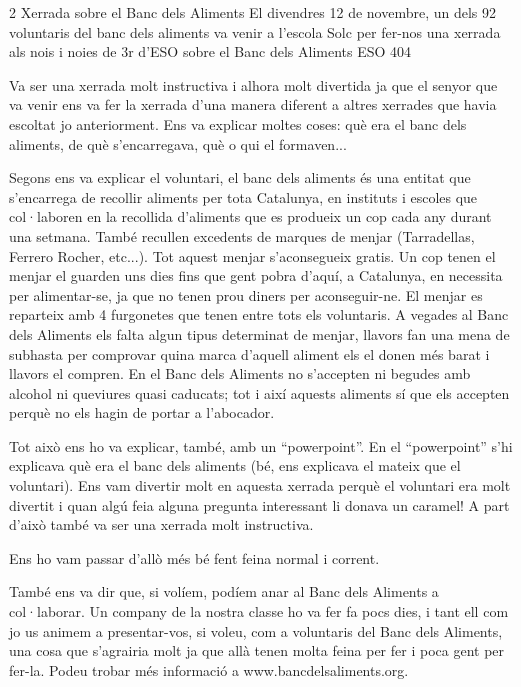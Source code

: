 
\begin{news}
{2} %
{Xerrada sobre el Banc dels Aliments}
{El divendres 12 de novembre,  un dels 92 voluntaris del banc dels aliments va venir a l’escola Solc per fer-nos una xerrada als nois i noies de 3r d’ESO sobre el Banc dels Aliments}
{ESO}
{404} %


Va ser una xerrada molt instructiva i alhora molt divertida ja que el senyor que va venir ens va fer la xerrada d’una manera diferent a altres xerrades que havia escoltat jo anteriorment. Ens va explicar moltes coses: què era el banc dels aliments, de què s’encarregava, què o qui el formaven...

Segons ens va explicar el voluntari, el banc dels aliments és una entitat que s’encarrega de recollir aliments per tota Catalunya, en instituts i escoles que col·laboren en la recollida d’aliments que es produeix un cop cada any durant una setmana. També recullen excedents de marques de menjar (Tarradellas, Ferrero Rocher, etc...). Tot aquest menjar s’aconsegueix gratis. Un cop tenen el menjar el guarden uns dies fins que gent pobra d’aquí, a Catalunya, en necessita per alimentar-se,  ja que no tenen prou diners per aconseguir-ne. El menjar es reparteix amb 4 furgonetes que tenen entre tots els voluntaris. A vegades al Banc dels Aliments els falta algun tipus determinat de menjar, llavors fan una mena de subhasta per comprovar quina marca d’aquell aliment els el donen més barat i llavors el compren. En el Banc dels Aliments no s’accepten ni begudes amb alcohol ni queviures quasi caducats;  tot i així aquests aliments sí que els accepten perquè no els hagin de portar a l’abocador.

Tot això ens  ho va explicar, també,  amb un “powerpoint”. En el “powerpoint” s’hi explicava què era el banc dels aliments (bé, ens explicava el mateix que el voluntari). Ens vam divertir molt en aquesta xerrada perquè el voluntari era molt divertit i quan algú feia alguna pregunta interessant li donava un caramel! A part d’això també va ser una xerrada molt instructiva.

Ens ho vam passar d’allò més bé fent feina normal i corrent.

També ens va dir que, si volíem, podíem anar al Banc dels Aliments a col·laborar. Un company de la nostra classe ho va fer fa pocs dies, i tant ell com jo us animem a presentar-vos, si voleu, com a voluntaris del Banc dels Aliments, una cosa que s’agrairia molt ja que allà tenen molta feina per fer i poca gent per fer-la. Podeu trobar més informació a www.bancdelsaliments.org.


\end{news}
